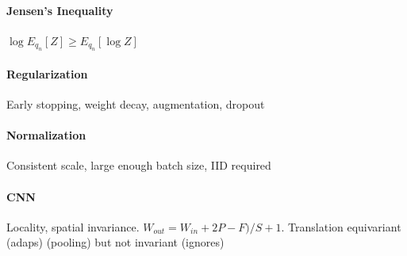 \documentclass[11pt]{article}
\begin{document}
\paragraph{Jensen's Inequality} $\log E_{q_n} [Z] \geq E_{q_n} [\log Z]$ 

\paragraph{Regularization} Early stopping, weight decay, augmentation, dropout

\paragraph{Normalization} Consistent scale, large enough batch size, IID required

\paragraph{CNN} Locality, spatial invariance. $W_{out} = W_{in} + 2 P - F) / S + 1$. Translation equivariant (adaps) (pooling) but not invariant (ignores)
\end{document}

